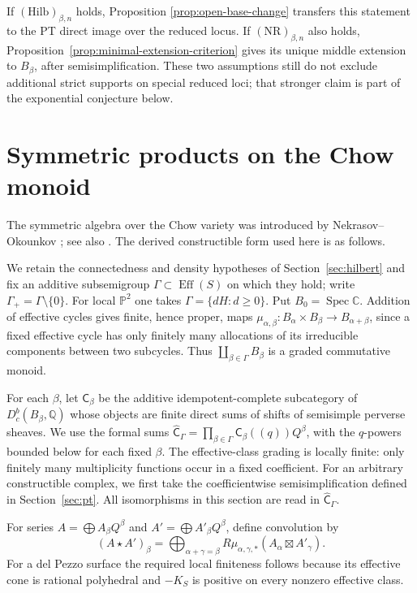 \documentclass[11pt,reqno]{amsart}
\theoremstyle{definition}
\newcommand{\C}{\mathbb C}
\newcommand{\Q}{\mathbb Q}
\newcommand{\Pp}{\mathbb P}
\newcommand{\Eff}{\operatorname{Eff}}
\begin{document}
If $(\mathrm{Hilb})_{\beta,n}$ holds, Proposition
\ref{prop:open-base-change} transfers this statement to the PT direct image
over the reduced locus.  If $(\mathrm{NR})_{\beta,n}$ also holds,
Proposition~\ref{prop:minimal-extension-criterion} gives its unique middle extension to
$B_\beta$, after semisimplification.  These two assumptions still do not
exclude additional strict supports on special reduced loci; that stronger
claim is part of the exponential conjecture below.

\section{Symmetric products on the Chow monoid}
\label{sec:chow-exponential}

The symmetric algebra over the Chow variety was introduced by
Nekrasov--Okounkov \cite[Section~2.3.5]{NekrasovOkounkov}; see also
\cite[Section~5.3.3]{OkounkovTakagi}.  The derived constructible form used
here is as follows.

We retain the connectedness and density hypotheses of
Section~\ref{sec:hilbert} and fix an additive subsemigroup
$\Gamma\subset\Eff(S)$ on which they hold; write
$\Gamma_+=\Gamma\setminus\{0\}$.  For local $\Pp^2$ one takes
$\Gamma=\{dH:d\ge0\}$.  Put $B_0=\operatorname{Spec}\C$.  Addition of effective
cycles gives finite, hence proper, maps
$\mu_{\alpha,\beta}:B_\alpha\times B_\beta\to B_{\alpha+\beta}$,
since a fixed effective cycle has only finitely many allocations of its
irreducible components between two subcycles.  Thus
$\coprod_{\beta\in\Gamma}B_\beta$ is a graded commutative monoid.

For each $\beta$, let $\mathsf C_\beta$ be the additive idempotent-complete
subcategory of $D_c^b(B_\beta,\Q)$ whose objects are finite direct sums of
shifts of semisimple perverse sheaves.  We use the formal sums
$\widehat{\mathsf C}_\Gamma=
\prod_{\beta\in\Gamma}\mathsf C_\beta((q))Q^\beta$, with the $q$-powers
bounded below for each fixed $\beta$.  The effective-class grading is
locally finite: only finitely many multiplicity functions occur in a fixed
coefficient.  For an arbitrary constructible complex, we first take the
coefficientwise semisimplification defined in Section~\ref{sec:pt}.  All
isomorphisms in this section are read in $\widehat{\mathsf C}_\Gamma$.

For
series $A=\bigoplus A_\beta Q^\beta$ and
$A'=\bigoplus A'_\beta Q^\beta$, define convolution by
\begin{equation}\label{eq:chow-convolution}
 (A\star A')_\beta
 =\bigoplus_{\alpha+\gamma=\beta}
 R\mu_{\alpha,\gamma,*}(A_\alpha\boxtimes A'_\gamma).
\end{equation}
For a del Pezzo surface the required local finiteness follows because its
effective cone is rational polyhedral and $-K_S$ is positive on every
nonzero effective class.
\end{document}
